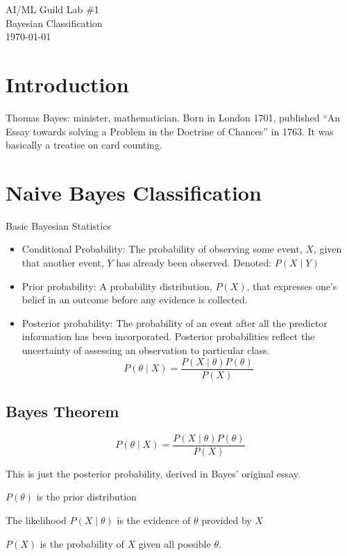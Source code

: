 \documentclass[letterpaper,12pt]{article}
\begin{document}
\begin{flushleft}
AI/ML Guild Lab \#1\\
Bayesian Classification\\
\today \\
\end{flushleft}

\section{Introduction}

Thomas Bayes: minister, mathematician. Born in London 1701, published ``An Essay
towards solving a Problem in the Doctrine of Chances'' in 1763. It was basically
a treatise on card counting.

\section{Naive Bayes Classification}

Basic Bayesian Statistics
\begin{itemize}
    \item Conditional Probability: The probability of observing some event, $X$,
        given that another event, $Y$ has already been observed. Denoted: $P(X \mid Y)$
    \item Prior probability: A probability distribution, $P(X)$, that expresses one's
        belief in an outcome before any evidence is collected.
    \item Posterior probability: The probability of an event after all the
        predictor information has been incorporated. Posterior probabilities
        reflect the uncertainty of assessing an observation to particular class.
        \[ P(\theta \mid X) = \frac{P(X \mid \theta)P(\theta)}{P(X)} \]
\end{itemize}

\subsection{Bayes Theorem}

\[
    P(\theta \mid X) = \frac{P(X \mid \theta)P(\theta)}{P(X)}
\]

This is just the posterior probability, derived in Bayes' original essay.

$P(\theta)$ is the prior distribution

The likelihood $P(X \mid \theta)$ is the evidence of $\theta$ provided by $X$

$P(X)$ is the probability of $X$ given all possible $\theta$.
\end{document}
